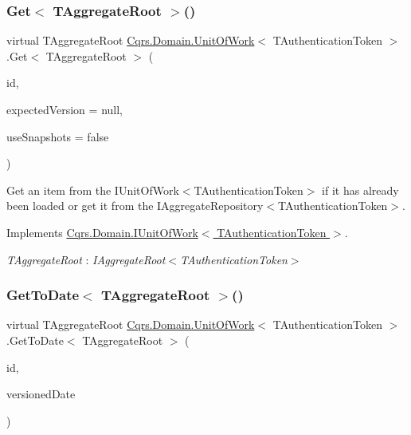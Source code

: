 \subsubsection{\texorpdfstring{Get$<$ T\+Aggregate\+Root $>$()}{Get< TAggregateRoot >()}}
{\footnotesize\ttfamily virtual T\+Aggregate\+Root \hyperlink{classCqrs_1_1Domain_1_1UnitOfWork}{Cqrs.\+Domain.\+Unit\+Of\+Work}$<$ T\+Authentication\+Token $>$.Get$<$ T\+Aggregate\+Root $>$ (\begin{DoxyParamCaption}\item[{Guid}]{id,  }\item[{int?}]{expected\+Version = {\ttfamily null},  }\item[{bool}]{use\+Snapshots = {\ttfamily false} }\end{DoxyParamCaption})\hspace{0.3cm}{\ttfamily [virtual]}}



Get an item from the I\+Unit\+Of\+Work$<$\+T\+Authentication\+Token$>$ if it has already been loaded or get it from the I\+Aggregate\+Repository$<$\+T\+Authentication\+Token$>$. 



Implements \hyperlink{interfaceCqrs_1_1Domain_1_1IUnitOfWork_aee78f81d472577a65356bc1c05207180_aee78f81d472577a65356bc1c05207180}{Cqrs.\+Domain.\+I\+Unit\+Of\+Work$<$ T\+Authentication\+Token $>$}.

\begin{Desc}
\item[Type Constraints]\begin{description}
\item[{\em T\+Aggregate\+Root} : {\em I\+Aggregate\+Root$<$T\+Authentication\+Token$>$}]\end{description}
\end{Desc}
\mbox{\label{classCqrs_1_1Domain_1_1UnitOfWork_ac5f0efae335bee99f820d1c53b3e9f93_ac5f0efae335bee99f820d1c53b3e9f93}} 
\subsubsection{\texorpdfstring{Get\+To\+Date$<$ T\+Aggregate\+Root $>$()}{GetToDate< TAggregateRoot >()}}
{\footnotesize\ttfamily virtual T\+Aggregate\+Root \hyperlink{classCqrs_1_1Domain_1_1UnitOfWork}{Cqrs.\+Domain.\+Unit\+Of\+Work}$<$ T\+Authentication\+Token $>$.Get\+To\+Date$<$ T\+Aggregate\+Root $>$ (\begin{DoxyParamCaption}\item[{Guid}]{id,  }\item[{Date\+Time}]{versioned\+Date }\end{DoxyParamCaption})\hspace{0.3cm}{\ttfamily [virtual]}}



